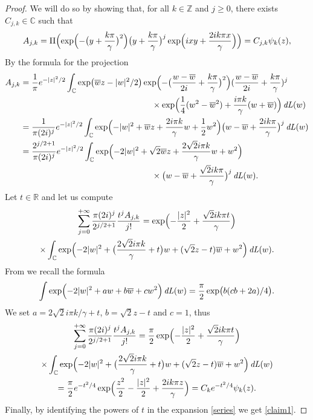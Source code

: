 \documentclass[JEP,XML,SOM,Unicode,NoFloatCountersInSection,published]{cedram}
\DeclareMathOperator{\dL}{\mathit{dL}}
\theoremstyle{definition}
\let\EE\exp
\let\ov\overline
\newcommand\C{\mathbb C}
\newcommand\R{\mathbb R}
\newcommand\Z{\mathbb Z}
\begin{document}
\begin{proof}
We will do so by showing that, for all $k \in \Z$ and $j \geq 0$, there exists $C_{j,k} \in \C$ such that
\begin{equation}\label{claim1}
A_{j,k}=\Pi\Bigl(\EE\Bigl({-\bigl(y+\frac{k \pi}\gamma\bigr)^2}\Bigr) \bigl(y+\frac{k \pi}\gamma\bigr)^j \EE\Bigl({ixy+\frac{2ik\pi x}{\gamma} } \Bigr)\Bigr)= C_{j,k} \psi_k(z),
\end{equation}
By the formula for the projection
\begin{align*}
A_{j,k}
&= \frac{1}{\pi} e^{-|z|^2/2} \int_\mathbb{C} \EE\bigl({\ov w z - |w|^2/2}\bigr) \EE\Bigl({-\bigl(\frac{w -\ov w}{2i}+\frac{k \pi}\gamma\bigr)^2} \Bigr)(\frac{w -\ov w}{2i}+\frac{k \pi}\gamma)^j \\
&\hspace{5.5cm}\times \EE\Bigl({\frac14(w^2-\ov w^2) +\frac{i \pi k}{\gamma}(w+\ov w)} \Bigr) \dL(w)\\
&= \frac{1}{\pi (2i)^j} e^{-|z|^2/2} \int_\mathbb{C} \EE \Bigl({-|w|^2 + \ov w z +\frac{2i \pi k}{\gamma} w+\frac12 w^2 } \Bigr) \bigl({w -\ov w}+\frac{2i k \pi}\gamma\bigr)^j \dL(w)\\
&= \frac{2^{j/2+1}}{\pi (2i)^j} e^{-|z|^2/2} \int_\mathbb{C} \EE\Bigl({-2|w|^2 + \sqrt{2}\ov w z +\frac{2 \sqrt{2}i \pi k}{\gamma} w+ w^2 } \Bigr) \\
&\hspace{5.5cm}\times \bigl({w -\ov w}+\frac{\sqrt{2}i k \pi}\gamma\bigr)^j \dL(w).
\end{align*}
Let $t\in \R$ and let us compute
\begin{multline*}
\sum_{j=0}^{+\infty} \frac{\pi (2i)^j}{2^{j/2+1}}\frac{t^j A_{j,k}}{j!}=\EE\Bigl(-\frac{|z|^2}2 + \frac{\sqrt{2}i k \pi t } \gamma \Bigr)\\
\times \int_\mathbb{C} \EE\Bigl({-2|w|^2 +\bigl(\frac{2 \sqrt{2}i \pi k}{\gamma} +t\bigr)w + (\sqrt{2}z-t)\ov w + w^2 } \Bigr) \dL(w).
\end{multline*}
From \cite[\S 6]{GGT} we recall the formula
\begin{equation*}
\int \EE\Bigl(-2 |w|^2 + aw + b\overline{w} + cw^2 \Bigr)\dL(w)
= \frac{\pi}{2} \EE\bigl({b(cb+2a)}/{4}\bigr).
\end{equation*}
We set $a={2 \sqrt{2}i \pi k}/{\gamma} +t$, $b=\sqrt{2}z-t$ and $c=1$, thus
\begin{multline}\label{series}
\sum_{j=0}^{+\infty} \frac{\pi (2i)^j}{2^{j/2+1}}\frac{t^j A_{j,k}}{j!}=\frac{\pi}{2} \EE\Bigl(-\frac{|z|^2}2 + \frac{\sqrt{2}i k \pi t } \gamma \Bigr)\\
\times \int_\mathbb{C} \EE\Bigl({-2|w|^2 +\bigl(\frac{2 \sqrt{2}i \pi k}{\gamma} +t\bigr)w + (\sqrt{2}z-t)\ov w + w^2 } \Bigr) \dL(w) \\
= \frac{\pi}{2} e^{- t^2/4} \EE\Bigl({\frac{z^2}{2}-\frac{|z|^2}2+\frac{2i k\pi z}{\gamma}}\Bigr) = C_k e^{-t^2/4}\psi_k(z).
\end{multline}
Finally, by identifying the powers of $t$ in the expansion \eqref{series} we get \eqref{claim1}.
\end{proof}
\end{document}
